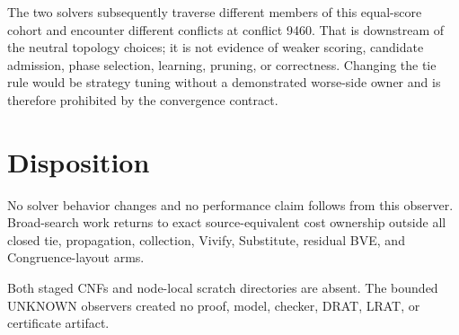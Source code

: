 \documentclass[11pt]{article}
\begin{document}
The two solvers subsequently traverse different members of this equal-score
cohort and encounter different conflicts at conflict 9460.  That is downstream
of the neutral topology choices; it is not evidence of weaker scoring,
candidate admission, phase selection, learning, pruning, or correctness.
Changing the tie rule would be strategy tuning without a demonstrated
worse-side owner and is therefore prohibited by the convergence contract.

\section{Disposition}
No solver behavior changes and no performance claim follows from this observer.
Broad-search work returns to exact source-equivalent cost ownership outside all
closed tie, propagation, collection, Vivify, Substitute, residual BVE, and
Congruence-layout arms.

Both staged CNFs and node-local scratch directories are absent.  The bounded
UNKNOWN observers created no proof, model, checker, DRAT, LRAT, or certificate
artifact.
\end{document}
